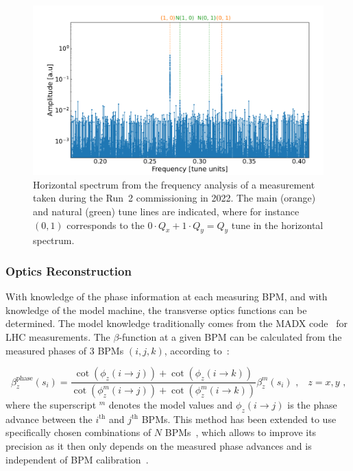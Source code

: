 \begin{figure}[!htb]
  \centering
  \includegraphics*[width=\linewidth]{Figures/Optics_Measurements_Corrections_at_LHC/example_bpm_spectrum.pdf}
  \caption{Horizontal spectrum from the frequency analysis of a measurement taken during the Run~\num{2} commissioning in \num{2022}. The main (\textcolor{mplorange}{orange}) and natural (\textcolor{mplgreen}{green}) tune lines are indicated, where for instance \((0, 1)\) corresponds to the \(0 \cdot Q_x + 1 \cdot Q_y = Q_y\) tune in the horizontal spectrum.}
  \label{figure:example_spectrum}
\end{figure}

\subsubsection*{Optics Reconstruction}

With knowledge of the phase information at each measuring BPM, and with knowledge of the model machine, the transverse optics functions can be determined.
The model knowledge traditionally comes from the \gls{MADX} code~\cite{CODE:MADX_guide} for LHC measurements.
The \(\beta\)-function at a given BPM can be calculated from the measured phases of \num{3} BPMs \((i, j, k)\), according to~\cite{PHD:Castro,BOOK:Minty:Measurements_Control_Charged_Particle_Beams}:

\begin{equation}
  \beta_z^{\mathrm{phase}}(s_i) = \frac{\cot \left(\phi_z(i \rightarrow j)\right) + \cot \left(\phi_z(i \rightarrow k)\right)}{\cot \left(\phi^m_z(i \rightarrow j)\right) + \cot \left(\phi^m_z(i \rightarrow k)\right)} \beta^m_z(s_i)  \text{ ,} \quad z = x, y \text{ ,}
  \label{equation:beta_from_phase}
\end{equation}
where the superscript \(^m\) denotes the model values and \(\phi_z(i \rightarrow j)\) is the phase advance between the \(i^{\mathrm{th}}\) and \(j^{\mathrm{th}}\) BPMs.
This method has been extended to use specifically chosen combinations of \(N\) BPMs~\cite{PRAB:Langner:N_BPM_Method,PRAB:Wegscheider:Analytical_N_BPM_Method}, which allows to improve its precision as it then only depends on the measured phase advances and is independent of BPM calibration~\cite{PRAB:Langner:Optics_Measurement_Algorithms_Error_Analysis_Proton_Energy_Frontier}.

